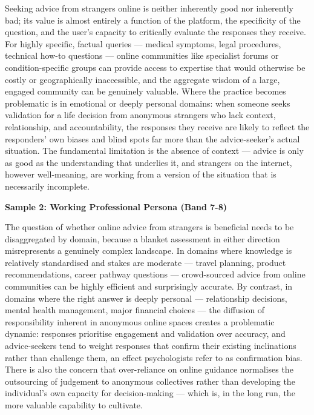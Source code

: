 Seeking advice from strangers online is neither inherently good nor inherently bad; its value is almost entirely a function of the platform, the specificity of the question, and the user's capacity to critically evaluate the responses they receive. For highly specific, factual queries — medical symptoms, legal procedures, technical how-to questions — online communities like specialist forums or condition-specific groups can provide access to expertise that would otherwise be costly or geographically inaccessible, and the aggregate wisdom of a large, engaged community can be genuinely valuable. Where the practice becomes problematic is in emotional or deeply personal domains: when someone seeks validation for a life decision from anonymous strangers who lack context, relationship, and accountability, the responses they receive are likely to reflect the responders' own biases and blind spots far more than the advice-seeker's actual situation. The fundamental limitation is the absence of context — advice is only as good as the understanding that underlies it, and strangers on the internet, however well-meaning, are working from a version of the situation that is necessarily incomplete.

\textbf{Sample 2: Working Professional Persona (Band 7-8)}

The question of whether online advice from strangers is beneficial needs to be disaggregated by domain, because a blanket assessment in either direction misrepresents a genuinely complex landscape. In domains where knowledge is relatively standardised and stakes are moderate — travel planning, product recommendations, career pathway questions — crowd-sourced advice from online communities can be highly efficient and surprisingly accurate. By contrast, in domains where the right answer is deeply personal — relationship decisions, mental health management, major financial choices — the diffusion of responsibility inherent in anonymous online spaces creates a problematic dynamic: responses prioritise engagement and validation over accuracy, and advice-seekers tend to weight responses that confirm their existing inclinations rather than challenge them, an effect psychologists refer to as confirmation bias. There is also the concern that over-reliance on online guidance normalises the outsourcing of judgement to anonymous collectives rather than developing the individual's own capacity for decision-making — which is, in the long run, the more valuable capability to cultivate.

\separator

